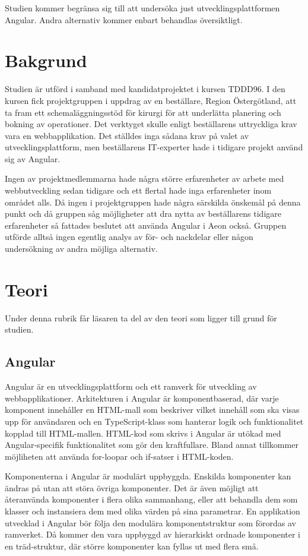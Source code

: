 Studien kommer begränsa sig till att undersöka just utvecklingsplattformen Angular. Andra alternativ kommer enbart behandlas översiktligt.

\section{Bakgrund}


Studien är utförd i samband med kandidatprojektet i kursen TDDD96. I den kursen fick projektgruppen i uppdrag av en beställare, Region Östergötland, att ta fram ett schemaläggningsstöd för kirurgi för att underlätta planering och bokning av operationer. Det verktyget skulle enligt beställarens uttryckliga krav vara en webbapplikation. Det ställdes inga sådana krav på valet av utvecklingsplattform, men beställarens IT-experter hade i tidigare projekt använd sig av Angular. 

Ingen av projektmedlemmarna hade några större erfarenheter av arbete med webbutveckling sedan tidigare och ett flertal hade inga erfarenheter inom området alls. Då ingen i projektgruppen hade några särskilda önskemål på denna punkt och då gruppen såg möjligheter att dra nytta av beställarens tidigare erfarenheter så fattades beslutet att använda Angular i Aeon också. Gruppen utförde alltså ingen egentlig analys av för- och nackdelar eller någon undersökning av andra möjliga alternativ.  

\section{Teori}

Under denna rubrik får läsaren ta del av den teori som ligger till grund för studien.

\subsection{Angular} \label{martin_angular}

Angular är en utvecklingsplattform och ett ramverk för utveckling av webbapplikationer. Arkitekturen i Angular är komponentbaserad, där varje komponent innehåller en HTML-mall som beskriver vilket innehåll som ska visas upp för användaren och en TypeScript-klass som hanterar logik och funktionalitet kopplad till HTML-mallen. HTML-kod som skrivs i Angular är utökad med Angular-specifik funktionalitet som gör den kraftfullare. Bland annat tillkommer möjliheten att använda for-loopar och if-satser i HTML-koden.

Komponenterna i Angular är modulärt uppbyggda. Enskilda komponenter kan ändras på utan att störa övriga komponenter. Det är även möjligt att återanvända komponenter i flera olika sammanhang, eller att behandla dem som klasser och instansiera dem med olika värden på sina parametrar. En applikation utvecklad i Angular bör följa den modulära komponentstruktur som förordas av ramverket. Då kommer den vara uppbyggd av hierarkiskt ordnade komponenter i en träd-struktur, där större komponenter kan fyllas ut med flera små.   

